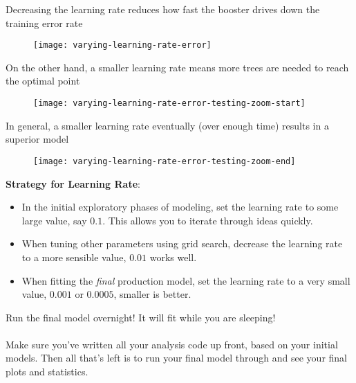 %
\begin{frame}
Decreasing the learning rate reduces how fast the booster drives down the training error rate
  \begin{figure}
    \texttt{[image: varying-learning-rate-error]}
  \end{figure}
  
\end{frame}
%
\begin{frame}
On the other hand, a smaller learning rate means more trees are needed to reach the optimal point

  \begin{figure}
    \texttt{[image: varying-learning-rate-error-testing-zoom-start]}
  \end{figure}
  
\end{frame}
%
\begin{frame}
In general, a smaller learning rate eventually (over enough time) results in a superior model

  \begin{figure}
    \texttt{[image: varying-learning-rate-error-testing-zoom-end]}
  \end{figure}
  
\end{frame}
%
\begin{frame}
\textbf{Strategy for Learning Rate}:

\begin{itemize}
  \item In the initial exploratory phases of modeling, set the learning rate to some large value, say $0.1$.  This allows you to iterate through ideas quickly.
  \item When tuning other parameters using grid search, decrease the learning rate to a more sensible value, $0.01$ works well.
  \item When fitting the \textit{final} production model, set the learning rate to a very small value, $0.001$ or $0.0005$, smaller is better.
\end{itemize}

\end{frame}
%
\begin{frame}

Run the final model overnight!  It will fit while you are sleeping!\\~\\

Make sure you've written all your analysis code up front, based on your initial models.  Then all that's left is to run your final model through and see your final plots and statistics.
\end{frame}

